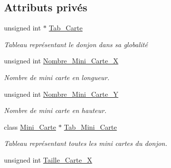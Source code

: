 \subsection*{Attributs privés}
\begin{DoxyCompactItemize}
\item 
\hypertarget{classCarte_ac05192c4de1abc2b401cc494583a6761}{unsigned int $\ast$ \hyperlink{classCarte_ac05192c4de1abc2b401cc494583a6761}{Tab\+\_\+\+Carte}}\label{classCarte_ac05192c4de1abc2b401cc494583a6761}

\begin{DoxyCompactList}\small\item\em Tableau représentant le donjon dans sa globalité \end{DoxyCompactList}\item 
\hypertarget{classCarte_ac1c0c313b9dae573c7595f79b8ec07fe}{unsigned int \hyperlink{classCarte_ac1c0c313b9dae573c7595f79b8ec07fe}{Nombre\+\_\+\+Mini\+\_\+\+Carte\+\_\+\+X}}\label{classCarte_ac1c0c313b9dae573c7595f79b8ec07fe}

\begin{DoxyCompactList}\small\item\em Nombre de mini carte en longueur. \end{DoxyCompactList}\item 
\hypertarget{classCarte_ad467dbb5d7adde77b6aa6d2fae5cd631}{unsigned int \hyperlink{classCarte_ad467dbb5d7adde77b6aa6d2fae5cd631}{Nombre\+\_\+\+Mini\+\_\+\+Carte\+\_\+\+Y}}\label{classCarte_ad467dbb5d7adde77b6aa6d2fae5cd631}

\begin{DoxyCompactList}\small\item\em Nombre de mini carte en hauteur. \end{DoxyCompactList}\item 
\hypertarget{classCarte_aaec1d510294d1e787ba28fffb09fce00}{class \hyperlink{classMini__Carte}{Mini\+\_\+\+Carte} $\ast$ \hyperlink{classCarte_aaec1d510294d1e787ba28fffb09fce00}{Tab\+\_\+\+Mini\+\_\+\+Carte}}\label{classCarte_aaec1d510294d1e787ba28fffb09fce00}

\begin{DoxyCompactList}\small\item\em Tableau représentant toutes les mini cartes du donjon. \end{DoxyCompactList}\item 
\hypertarget{classCarte_a4824c6dc3b7435f1653af395a6891a4d}{unsigned int \hyperlink{classCarte_a4824c6dc3b7435f1653af395a6891a4d}{Taille\+\_\+\+Carte\+\_\+\+X}}\label{classCarte_a4824c6dc3b7435f1653af395a6891a4d}


\end{DoxyCompactItemize}
